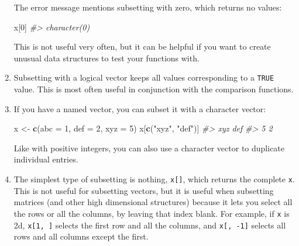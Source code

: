 \documentclass[]{book}
\newenvironment{Shaded}{\begin{snugshade}}{\end{snugshade}}
\newcommand{\KeywordTok}[1]{\textcolor[rgb]{0.13,0.29,0.53}{\textbf{{#1}}}}
\newcommand{\DataTypeTok}[1]{\textcolor[rgb]{0.13,0.29,0.53}{{#1}}}
\newcommand{\DecValTok}[1]{\textcolor[rgb]{0.00,0.00,0.81}{{#1}}}
\newcommand{\StringTok}[1]{\textcolor[rgb]{0.31,0.60,0.02}{{#1}}}
\newcommand{\CommentTok}[1]{\textcolor[rgb]{0.56,0.35,0.01}{\textit{{#1}}}}
\newcommand{\OtherTok}[1]{\textcolor[rgb]{0.56,0.35,0.01}{{#1}}}
\newcommand{\NormalTok}[1]{{#1}}
\begin{document}
\begin{enumerate}
  The error message mentions subsetting with zero, which returns no
  values:

\begin{Shaded}
\begin{Highlighting}[]
\NormalTok{x[}\DecValTok{0}\NormalTok{]}
\CommentTok{#> character(0)}
\end{Highlighting}
\end{Shaded}

  This is not useful very often, but it can be helpful if you want to
  create unusual data structures to test your functions with.
\item
  Subsetting with a logical vector keeps all values corresponding to a
  \texttt{TRUE} value. This is most often useful in conjunction with the
  comparison functions.

\begin{Shaded}
\end{Shaded}
\item
  If you have a named vector, you can subset it with a character vector:

\begin{Shaded}
\begin{Highlighting}[]
\NormalTok{x <-}\StringTok{ }\KeywordTok{c}\NormalTok{(}\DataTypeTok{abc =} \DecValTok{1}\NormalTok{, }\DataTypeTok{def =} \DecValTok{2}\NormalTok{, }\DataTypeTok{xyz =} \DecValTok{5}\NormalTok{)}
\NormalTok{x[}\KeywordTok{c}\NormalTok{(}\StringTok{"xyz"}\NormalTok{, }\StringTok{"def"}\NormalTok{)]}
\CommentTok{#> xyz def }
\CommentTok{#>   5   2}
\end{Highlighting}
\end{Shaded}

  Like with positive integers, you can also use a character vector to
  duplicate individual entries.
\item
  The simplest type of subsetting is nothing, \texttt{x{[}{]}}, which
  returns the complete \texttt{x}. This is not useful for subsetting
  vectors, but it is useful when subsetting matrices (and other high
  dimensional structures) because it lets you select all the rows or all
  the columns, by leaving that index blank. For example, if \texttt{x}
  is 2d, \texttt{x{[}1,\ {]}} selects the first row and all the columns,
  and \texttt{x{[},\ -1{]}} selects all rows and all columns except the
  first.
\end{enumerate}
\end{document}
